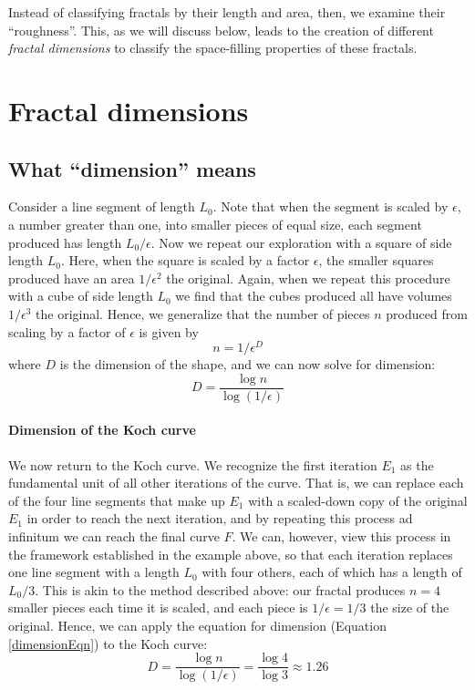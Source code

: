 Instead of classifying fractals by their length and area, then, we examine their ``roughness''. This, as we will discuss below, leads to the creation of different \textit{fractal dimensions} to classify the space-filling properties of these fractals.


\section{Fractal dimensions}

\subsection{What ``dimension'' means}
Consider a line segment of length $ L_0 $. Note that when the segment is scaled by $\epsilon$, a number greater than one, into smaller pieces of equal size, each segment produced has length $L_0/\epsilon$. Now we repeat our exploration with a square of side length $ L_0 $. Here, when the square is scaled by a factor $\epsilon$, the smaller squares produced have an area $1/\epsilon^2$ the original. Again, when we repeat this procedure with a cube of side length $ L_0 $ we find that the cubes produced all have volumes $1/\epsilon^3$ the original. Hence, we generalize that the number of pieces $n$ produced from scaling by a factor of $\epsilon$ is given by 
\begin{equation}
n = 1/\epsilon^D
\end{equation}
where $D$ is the dimension of the shape, and we can now solve for dimension:
\begin{equation}\label{dimensionEqn}
 D = \frac{\log{n}}{\log{(1/\epsilon)}}
\end{equation}

\paragraph{Dimension of the Koch curve} We now return to the Koch curve. We recognize the first iteration $E_1$ as the fundamental unit of all other iterations of the curve. That is, we can replace each of the four line segments that make up $E_1$ with a scaled-down copy of the original $E_1$ in order to reach the next iteration, and by repeating this process ad infinitum we can reach the final curve $F$. We can, however, view this process in the framework established in the example above, so that each iteration replaces one line segment with a length $L_0$ with four others, each of which has a length of $L_0/3$. This is akin to the method described above: our fractal produces $n = 4$ smaller pieces each time it is scaled, and each piece is $1/\epsilon = 1/3$ the size of the original. Hence, we can apply the equation for dimension (Equation \ref{dimensionEqn}) to the Koch curve:
\begin{equation}
D = \frac{\log{n}}{\log{(1/\epsilon)}} = \frac{\log{4}}{\log{3}} \approx 1.26
\end{equation}

